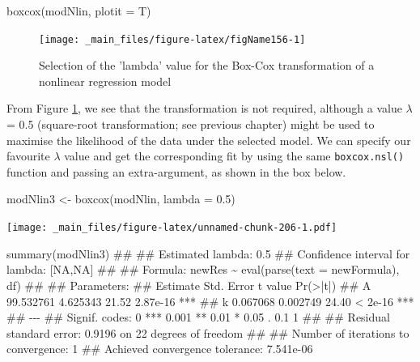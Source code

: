 \documentclass[a4paper,12pt,oneside]{book}
\newenvironment{Shaded}{\begin{snugshade}}{\end{snugshade}}
\newcommand{\FloatTok}[1]{#1}
\newcommand{\DocumentationTok}[1]{#1}
\newcommand{\OtherTok}[1]{#1}
\newcommand{\FunctionTok}[1]{#1}
\newcommand{\AttributeTok}[1]{#1}
\newcommand{\NormalTok}[1]{#1}
\begin{document}
\begin{Shaded}
\begin{Highlighting}[]
\FunctionTok{boxcox}\NormalTok{(modNlin, }\AttributeTok{plotit =}\NormalTok{ T)}
\end{Highlighting}
\end{Shaded}

\begin{figure}

{\centering \texttt{[image: \_main\_files/figure-latex/figName156-1]} 

}

\caption{Selection of the 'lambda' value for the Box-Cox transformation of a nonlinear regression model}\label{fig:figName156}
\end{figure}

From Figure \ref{fig:figName156}, we see that the transformation is not required, although a value \(\lambda\) = 0.5 (square-root transformation; see previous chapter) might be used to maximise the likelihood of the data under the selected model. We can specify our favourite \(\lambda\) value and get the corresponding fit by using the same \texttt{boxcox.nsl()} function and passing an extra-argument, as shown in the box below.

\vspace{12pt}

\begin{Shaded}
\begin{Highlighting}[]
\NormalTok{modNlin3 }\OtherTok{\textless{}{-}} \FunctionTok{boxcox}\NormalTok{(modNlin, }\AttributeTok{lambda =} \FloatTok{0.5}\NormalTok{)}
\end{Highlighting}
\end{Shaded}

\texttt{[image: \_main\_files/figure-latex/unnamed-chunk-206-1.pdf]}

\begin{Shaded}
\begin{Highlighting}[]
\FunctionTok{summary}\NormalTok{(modNlin3)}
\DocumentationTok{\#\# }
\DocumentationTok{\#\# Estimated lambda: 0.5 }
\DocumentationTok{\#\# Confidence interval for lambda: [NA,NA]}
\DocumentationTok{\#\# }
\DocumentationTok{\#\# Formula: newRes \textasciitilde{} eval(parse(text = newFormula), df)}
\DocumentationTok{\#\# }
\DocumentationTok{\#\# Parameters:}
\DocumentationTok{\#\#    Estimate Std. Error t value Pr(\textgreater{}|t|)    }
\DocumentationTok{\#\# A 99.532761   4.625343   21.52 2.87e{-}16 ***}
\DocumentationTok{\#\# k  0.067068   0.002749   24.40  \textless{} 2e{-}16 ***}
\DocumentationTok{\#\# {-}{-}{-}}
\DocumentationTok{\#\# Signif. codes:  0 \textquotesingle{}***\textquotesingle{} 0.001 \textquotesingle{}**\textquotesingle{} 0.01 \textquotesingle{}*\textquotesingle{} 0.05 \textquotesingle{}.\textquotesingle{} 0.1 \textquotesingle{} \textquotesingle{} 1}
\DocumentationTok{\#\# }
\DocumentationTok{\#\# Residual standard error: 0.9196 on 22 degrees of freedom}
\DocumentationTok{\#\# }
\DocumentationTok{\#\# Number of iterations to convergence: 1 }
\DocumentationTok{\#\# Achieved convergence tolerance: 7.541e{-}06}
\end{Highlighting}
\end{Shaded}
\end{document}

